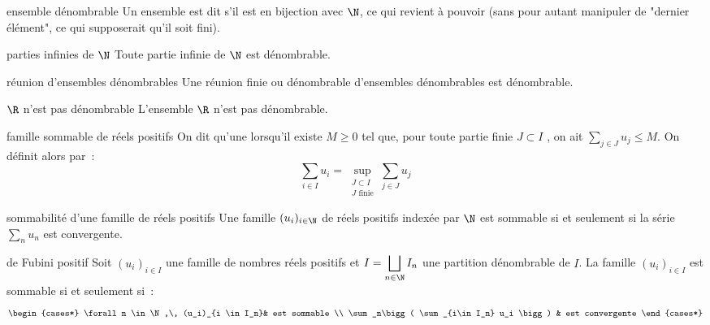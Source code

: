 

\begin{adjustwidth}{-3cm}{-3cm}


\begin{definition}{8.1}{ensemble dénombrable}
    Un ensemble est dit  s'il est en bijection avec $\N$, ce qui revient à pouvoir  (sans pour autant manipuler de "dernier élément", ce qui supposerait qu'il soit fini).
\end{definition}

\begin{proposition}{8.5}{parties infinies de $\N$}
    Toute partie infinie de $\N$ est dénombrable.
\end{proposition}

\begin{proposition}{8.10}{réunion d'ensembles dénombrables}
    Une réunion finie ou dénombrable d’ensembles dénombrables est dénombrable.
\end{proposition}

\begin{theoreme}{8.13}{$\R$ n'est pas dénombrable}
    L’ensemble $\R$ n’est pas dénombrable.
\end{theoreme}

\begin{definition}{8.14}{famille sommable de réels positifs}
    On dit qu’une  lorsqu’il existe $M\geq 0$ tel que, pour toute partie finie $J \subset I$ , on ait $\sum_{j \in J}u_j \leq M$.
    On définit alors  par~:
    $$\sum_{i \in I}u_i = \sup_{\substack{J \subset I \\ J\text{ finie}}} \sum_{j \in J} u_j$$
\end{definition}

\begin{proposition}{8.15}{sommabilité d'une famille de réels positifs}
    Une famille $(u_i)_{i \in \N}$ de réels positifs indexée par $\N$ est sommable si et seulement si la série $\sum_n u_n$ est convergente.
\end{proposition}

\begin{theoreme}{8.17}{de Fubini positif}
    Soit $(u_i)_{i\in I}$ une famille de nombres réels positifs et $\displaystyle I = \bigsqcup_{n\in \N} I_n$ une partition dénombrable de $I$. La famille $(u_i)_{i\in I}$ est sommable si et seulement si~:
    $$\begin{cases*}
        \forall n \in \N,\, (u_i)_{i \in I_n}& est sommable \\
        \sum_n\bigg( \sum_{i\in I_n} u_i \bigg) & est convergente
    \end{cases*}$$


\end{theoreme}
\end{adjustwidth}
